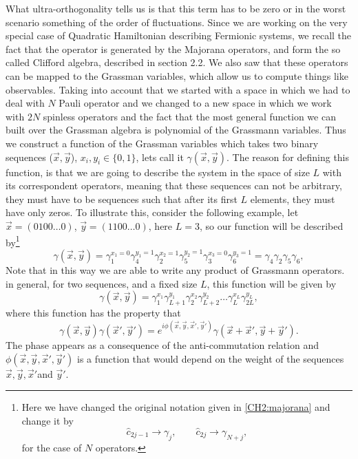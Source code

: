 \indent What ultra-orthogonality tells us is that this term has to be zero or in the worst scenario something of the order of fluctuations. Since we are working on the very special case of Quadratic Hamiltonian describing Fermionic systems, we recall the fact that the operator is generated by the Majorana operators, and form the so called Clifford algebra, described in section 2.2. We also saw that these operators can be mapped to the Grassman variables, which allow us to compute things like observables. Taking into account that we started with a space in which we had to deal with $N$ Pauli operator and we changed to a new space in which we work with $2N$ spinless operators and the fact that the most general  function we can built over the Grassman algebra is polynomial of the Grassmann variables. Thus we construct a function of the Grassman variables which takes two binary sequences ($\vec{x},\vec{y}$), $x_i,y_i \in \{0,1\}$, lets call it $\gamma(\vec{x},\vec{y})$. The reason for defining this function, is that we are going to describe the system in the space of size $L$ with its correspondent operators, meaning that these sequences can not be arbitrary, they must have to be sequences such that after its first $L$ elements, they must have only zeros. To illustrate this, consider the following example, let $\vec{x}=(0100\ldots 0)$, $\vec{y}=(1100\ldots 0)$, here $L=3$, so our function will be described by\footnote{Here we have changed the original notation given in \eqref{CH2:majorana} and change it by 
\begin{equation}
\hat{c}_{2j-1}\rightarrow \gamma_{j} , \qquad \hat{c}_{2j}\rightarrow \gamma_{N+j},
\end{equation}
for the case of $N$ operators.
}
\begin{equation}
\gamma(\vec{x},\vec{y}) = \gamma_1^{x_1=0} \gamma_{4}^{y_1=1} \gamma_{2}^{x_2=1} \gamma_{5}^{y_2=1} \gamma_{3}^{x_3=0} \gamma_{6}^{y_3=1} = \gamma_{4}\gamma_{2}\gamma_{5}\gamma_{6},
\end{equation}
Note that in this way we are able to write any product of Grassmann operators. in general, for two sequences, and a fixed size $L$, this function will be given by
\begin{equation}
\gamma(\vec{x},\vec{y}) = \gamma_1^{x_1} \gamma_{L+1}^{y_1} \gamma_{2}^{x_2} \gamma_{L+2}^{y_2}\ldots \gamma_{L}^{x_L} \gamma_{2L}^{y_L},
\end{equation} 
where this function has the property that
\begin{equation}
\gamma(\vec{x},\vec{y})\gamma(\vec{x}',\vec{y}') = e^{i\phi(\vec{x},\vec{y},\vec{x}',\vec{y}')} \gamma(\vec{x}+\vec{x}',\vec{y}+\vec{y}').
\label{CH2:my_relation_delta}
\end{equation}
The phase appears as a consequence of the anti-commutation relation and $\phi(\vec{x},\vec{y},\vec{x}',\vec{y}')$ is a function that would depend on the weight of the sequences $\vec{x},\vec{y},\vec{x}'$and $\vec{y}'$.\\

